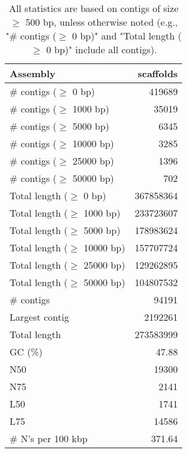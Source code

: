 \documentclass[12pt,a4paper]{article}
\begin{document}
\begin{table}[ht]
\begin{center}
\caption{All statistics are based on contigs of size $\geq$ 500 bp, unless otherwise noted (e.g., "\# contigs ($\geq$ 0 bp)" and "Total length ($\geq$ 0 bp)" include all contigs).}
\begin{tabular}{|l*{1}{|r}|}
\hline
Assembly & scaffolds \\ \hline
\# contigs ($\geq$ 0 bp) & 419689 \\ \hline
\# contigs ($\geq$ 1000 bp) & 35019 \\ \hline
\# contigs ($\geq$ 5000 bp) & 6345 \\ \hline
\# contigs ($\geq$ 10000 bp) & 3285 \\ \hline
\# contigs ($\geq$ 25000 bp) & 1396 \\ \hline
\# contigs ($\geq$ 50000 bp) & 702 \\ \hline
Total length ($\geq$ 0 bp) & 367858364 \\ \hline
Total length ($\geq$ 1000 bp) & 233723607 \\ \hline
Total length ($\geq$ 5000 bp) & 178983624 \\ \hline
Total length ($\geq$ 10000 bp) & 157707724 \\ \hline
Total length ($\geq$ 25000 bp) & 129262895 \\ \hline
Total length ($\geq$ 50000 bp) & 104807532 \\ \hline
\# contigs & 94191 \\ \hline
Largest contig & 2192261 \\ \hline
Total length & 273583999 \\ \hline
GC (\%) & 47.88 \\ \hline
N50 & 19300 \\ \hline
N75 & 2141 \\ \hline
L50 & 1741 \\ \hline
L75 & 14586 \\ \hline
\# N's per 100 kbp & 371.64 \\ \hline
\end{tabular}
\end{center}
\end{table}
\end{document}
